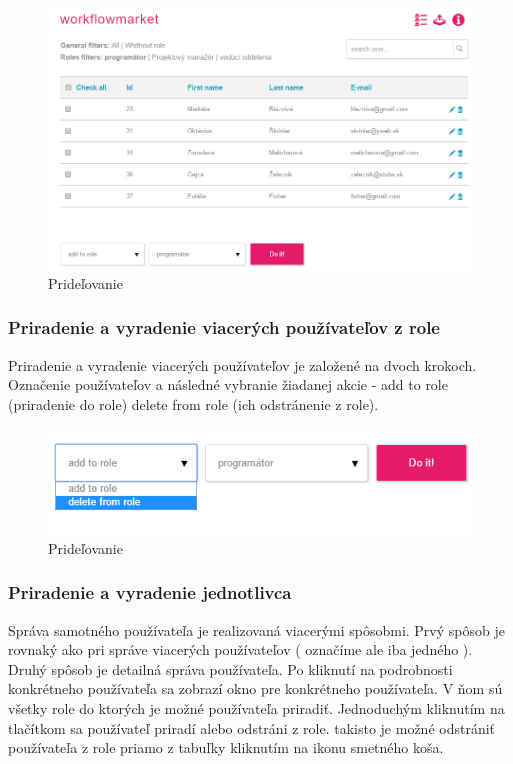\begin{figure}[h]
	\centering
	\includegraphics[width=0.9\linewidth]{images/server_roli_screen}
	\caption{ Prideľovanie  }
	\label{fig:server_roli_screen}
\end{figure}

\subsubsection{Priradenie a vyradenie viacerých používateľov z role}
Priradenie a vyradenie viacerých používateľov je založené na dvoch krokoch. Označenie používateľov a následné vybranie žiadanej akcie - add to role (priradenie do role) delete from role (ich odstránenie z role).  

\begin{figure}[h]
	\centering
	\includegraphics[width=0.5\linewidth]{images/role_actions_screen}
	\caption{ Prideľovanie  }
	\label{fig:server_roli_screen}
\end{figure}

\subsubsection{Priradenie a vyradenie jednotlivca}
Správa samotného používateľa je realizovaná viacerými spôsobmi. Prvý spôsob je rovnaký ako pri správe viacerých používateľov ( označíme ale iba jedného ). Druhý spôsob je detailná správa používateľa. Po kliknutí na podrobnosti konkrétneho používateľa sa zobrazí okno pre konkrétneho používateľa. V ňom sú všetky role do ktorých je možné používateľa priradiť. Jednoduchým kliknutím na tlačítkom sa používateľ priradí alebo odstráni z role. takisto je možné odstrániť používateľa z role priamo z tabuľky kliknutím na ikonu smetného koša.

